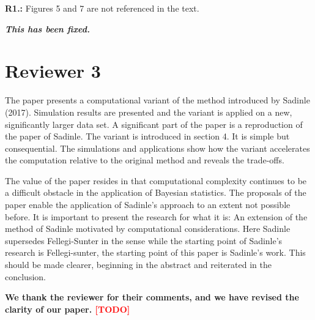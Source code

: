 \documentclass[letterpaper, parskip]{scrartcl}
\newcommand{\pointRaised}[2]{%
	\textbf{#1.\theresponsectr:} #2
}
\newcounter{responsectr}[section]     %
\newcommand{\reply}[1]{%
	\refstepcounter{responsectr}%
		\begin{tcolorbox}
			\itshape #1
		\end{tcolorbox}
}
\newcommand{\todo}{\textcolor{red}{[TODO]}\xspace}
\begin{document}
\pointRaised{R1}{%
	Figures 5 and 7 are not referenced in the text.
}
\reply{%
	\textbf{This has been fixed.}
}

	\clearpage
	\newpage

	\section*{Reviewer 3}
	\setcounter{responsectr}{0}

	The paper presents a computational variant of the method introduced by Sadinle (2017). Simulation results are presented and the variant is applied on a new, significantly larger data set. A significant part of the paper is a reproduction of the paper of Sadinle. The variant is introduced in section 4. It is simple but consequential. The simulations and applications show how the variant accelerates the computation relative to the original method and reveals the trade-offs.
	
	The value of the paper resides in that computational complexity continues to be a difficult obstacle in the application of Bayesian statistics. The proposals of the paper enable the application of Sadinle’s approach to an extent not possible before. It is important to present the research for what it is: An extension of the method of Sadinle motivated by computational considerations. Here Sadinle supersedes Fellegi-Sunter in the sense while the starting point of Sadinle’s research is Fellegi-sunter, the starting point of this paper is Sadinle’s work. This should be made clearer, beginning in the abstract and reiterated in the conclusion.

	\textbf{We thank the reviewer for their comments, and we have revised the clarity of our paper. \todo}
\end{document}

